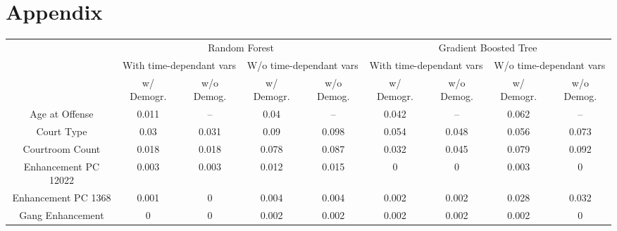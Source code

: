 \section{Appendix}
\begin{table*}[]
\centering
\tiny
\begin{tabular}{@{}ccccc@{\qquad}cccc@{}}
\cmidrule(r){2-5} \cmidrule(l){7-10}
                          & \multicolumn{4}{c}{Random Forest}                                                            & \multicolumn{4}{c}{Gradient Boosted Tree}                                                  \\ \cmidrule(r){2-5} \cmidrule(l){7-10} 
                          & \multicolumn{2}{c}{With time-dependant vars} & \multicolumn{2}{c}{W/o time-dependant vars}   & \multicolumn{2}{c}{With time-dependant vars} & \multicolumn{2}{c}{W/o time-dependant vars} \\
                          & w/ Demogr.            & w/o Demog.           & w/ Demogr.           & w/o Demog.             & w/ Demogr.            & w/o Demog.           & w/ Demogr.           & w/o Demog.           \\
Age at Offense            & 0.011                 & --                   & 0.04                 & --                     & 0.042                 & --                   & 0.062                & --                   \\
Court Type                & 0.03                  & 0.031                & 0.09                 & 0.098                  & 0.054                 & 0.048                & 0.056                & 0.073                \\
Courtroom Count           & 0.018                 & 0.018                & 0.078                & 0.087                  & 0.032                 & 0.045                & 0.079                & 0.092                \\
Enhancement PC 12022      & 0.003                 & 0.003                & 0.012                & 0.015                  & 0                     & 0                    & 0.003                & 0                    \\
Enhancement PC 1368       & 0.001                 & 0                    & 0.004                & 0.004                  & 0.002                 & 0.002                & 0.028                & 0.032                \\
Gang Enhancement          & 0                     & 0                    & 0.002                & 0.002                  & 0.002                 & 0.002                & 0.002                & 0                    \\

\end{tabular}
\end{table*}
